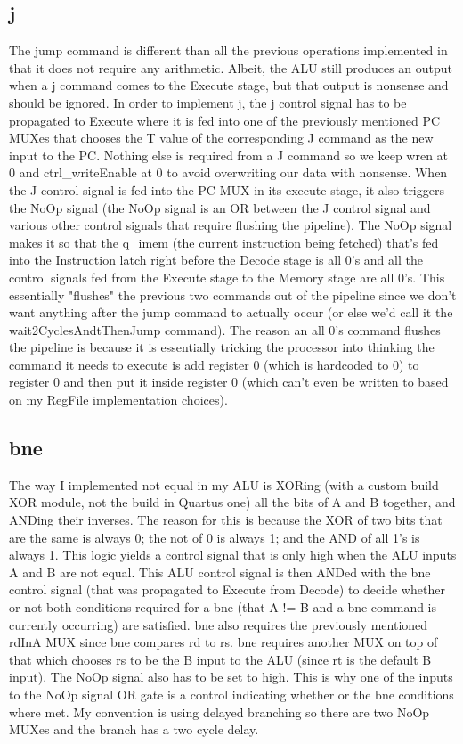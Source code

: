 \documentclass[letterpaper]{article} %
\begin{document}
    \subsection{j}
        The jump command is different than all the previous operations implemented in that it does not require any arithmetic. Albeit, the ALU still produces an output when a j command comes to the Execute stage, but that output is nonsense and should be ignored. In order to implement j, the j control signal has to be propagated to Execute where it is fed into one of the previously mentioned PC MUXes that chooses the T value of the corresponding J command as the new input to the PC. Nothing else is required from a J command so we keep wren at 0 and ctrl\_writeEnable at 0 to avoid overwriting our data with nonsense. When the J control signal is fed into the PC MUX in its execute stage, it also triggers the NoOp signal (the NoOp signal is an OR between the J control signal and various other control signals that require flushing the pipeline). The NoOp signal makes it so that the q\_imem (the current instruction being fetched) that's fed into the Instruction latch right before the Decode stage is all 0's and all the control signals fed from the Execute stage to the Memory stage are all 0's. This essentially "flushes" the previous two commands out of the pipeline since we don't want anything after the jump command to actually occur (or else we'd call it the wait2CyclesAndtThenJump command). The reason an all 0's command flushes the pipeline is because it is essentially tricking the processor into thinking the command it needs to execute is add register 0 (which is hardcoded to 0) to register 0 and then put it inside register 0 (which can't even be written to based on my RegFile implementation choices).
    
    \subsection{bne}
        The way I implemented not equal in my ALU is XORing (with a custom build XOR module, not the build in Quartus one) all the bits of A and B together, and ANDing their inverses. The reason for this is because the XOR of two bits that are the same is always 0; the not of 0 is always 1; and the AND of all 1's is always 1. This logic yields a control signal that is only high when the ALU inputs A and B are not equal. This ALU control signal is then ANDed with the bne control signal (that was propagated to Execute from Decode) to decide whether or not both conditions required for a bne (that A != B and a bne command is currently occurring) are satisfied. bne also requires the previously mentioned rdInA MUX since bne compares rd to rs. bne requires another MUX on top of that which chooses rs to be the B input to the ALU (since rt is the default B input). The NoOp signal also has to be set to high. This is why one of the inputs to the NoOp signal OR gate is a control indicating whether or the bne conditions where met. My convention is using delayed branching so there are two NoOp MUXes and the branch has a two cycle delay.
    
\end{document}
